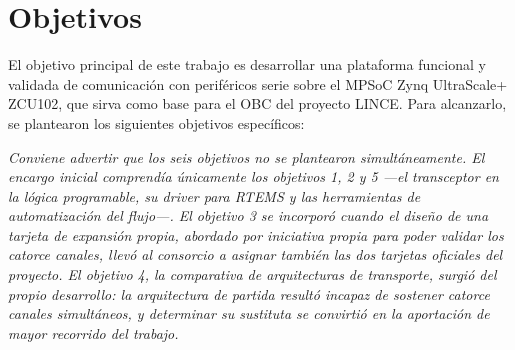 \section{Objetivos} \label{objetivos}

El objetivo principal de este trabajo es desarrollar una plataforma funcional y validada de
comunicación con periféricos serie sobre el MPSoC Zynq UltraScale+ ZCU102, que sirva
como base para el OBC del proyecto LINCE. Para alcanzarlo, se plantearon los siguientes
objetivos específicos:

\vspace{0.2cm}
\noindent\textit{Conviene advertir que los seis objetivos no se plantearon simultáneamente. El
encargo inicial comprendía únicamente los objetivos 1, 2 y 5 ---el transceptor en la lógica
programable, su driver para RTEMS y las herramientas de automatización del flujo---. El objetivo 3
se incorporó cuando el diseño de una tarjeta de expansión propia, abordado por iniciativa propia
para poder validar los catorce canales, llevó al consorcio a asignar también las dos tarjetas
oficiales del proyecto. El objetivo 4, la comparativa de arquitecturas de transporte, surgió del
propio desarrollo: la arquitectura de partida resultó incapaz de sostener catorce canales
simultáneos, y determinar su sustituta se convirtió en la aportación de mayor recorrido del
trabajo.}
\vspace{0.2cm}

